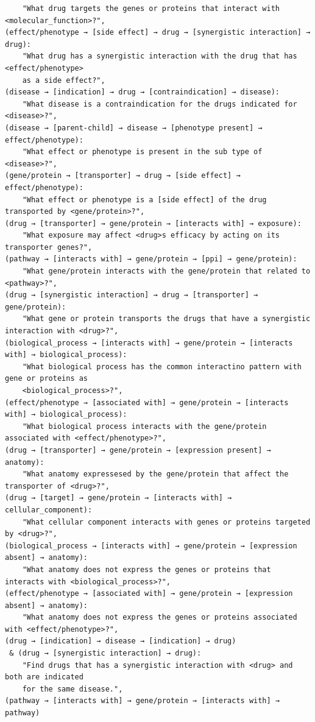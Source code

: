 \begin{mdframed}[backgroundcolor=gray!5, linecolor=black, linewidth=2pt, innerleftmargin=10pt, innerrightmargin=10pt, innertopmargin=3pt, innerbottommargin=10pt]
\begin{scriptsize}
\begin{verbatim}
    "What drug targets the genes or proteins that interact with <molecular_function>?",
(effect/phenotype → [side effect] → drug → [synergistic interaction] → drug): 
    "What drug has a synergistic interaction with the drug that has <effect/phenotype> 
    as a side effect?",
(disease → [indication] → drug → [contraindication] → disease): 
    "What disease is a contraindication for the drugs indicated for <disease>?",
(disease → [parent-child] → disease → [phenotype present] → effect/phenotype): 
    "What effect or phenotype is present in the sub type of <disease>?",
(gene/protein → [transporter] → drug → [side effect] → effect/phenotype): 
    "What effect or phenotype is a [side effect] of the drug transported by <gene/protein>?",
(drug → [transporter] → gene/protein → [interacts with] → exposure): 
    "What exposure may affect <drug>s efficacy by acting on its transporter genes?",
(pathway → [interacts with] → gene/protein → [ppi] → gene/protein): 
    "What gene/protein interacts with the gene/protein that related to <pathway>?",
(drug → [synergistic interaction] → drug → [transporter] → gene/protein): 
    "What gene or protein transports the drugs that have a synergistic interaction with <drug>?",
(biological_process → [interacts with] → gene/protein → [interacts with] → biological_process): 
    "What biological process has the common interactino pattern with gene or proteins as 
    <biological_process>?",
(effect/phenotype → [associated with] → gene/protein → [interacts with] → biological_process): 
    "What biological process interacts with the gene/protein associated with <effect/phenotype>?",
(drug → [transporter] → gene/protein → [expression present] → anatomy): 
    "What anatomy expressesed by the gene/protein that affect the transporter of <drug>?",
(drug → [target] → gene/protein → [interacts with] → cellular_component): 
    "What cellular component interacts with genes or proteins targeted by <drug>?",
(biological_process → [interacts with] → gene/protein → [expression absent] → anatomy): 
    "What anatomy does not express the genes or proteins that interacts with <biological_process>?",
(effect/phenotype → [associated with] → gene/protein → [expression absent] → anatomy): 
    "What anatomy does not express the genes or proteins associated with <effect/phenotype>?",
(drug → [indication] → disease → [indication] → drug) 
 & (drug → [synergistic interaction] → drug): 
    "Find drugs that has a synergistic interaction with <drug> and both are indicated 
    for the same disease.",
(pathway → [interacts with] → gene/protein → [interacts with] → pathway) 

\end{verbatim}
\end{scriptsize}
\end{mdframed}
